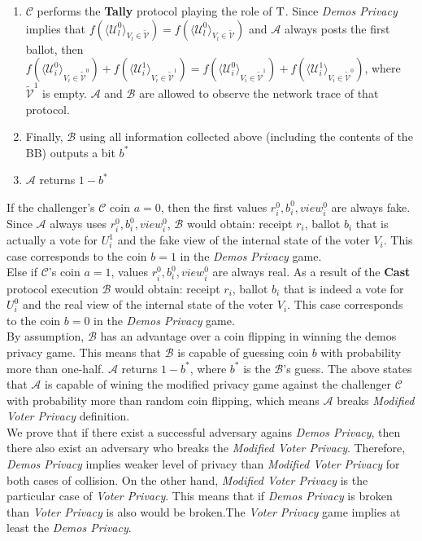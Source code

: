 \begin{enumerate}
\begin{enumerate}
\item $\mathcal{C}$ performs the \textbf{Tally} protocol playing the role of $\operatorname{T}$. Since \textit{Demos Privacy} implies that  $f(\langle \mathcal{U}^0_l \rangle _{V_l \in \tilde{\mathcal{V}}} ) = f(\langle \mathcal{U}^0_l \rangle _{V_l \in \tilde{\mathcal{V}}})$ and  $\mathcal{A}$ always posts the first ballot, then  $f(\langle \mathcal{U}^0_i \rangle _{V_i \in \tilde{\mathcal{V}}^0} ) + f(\langle \mathcal{U}^1_i \rangle _{V_i \in \tilde{\mathcal{V}}^1} ) =  f(\langle \mathcal{U}^0_i \rangle _{V_i \in \tilde{\mathcal{V}}^1} ) +  f(\langle \mathcal{U}^1_i \rangle _{V_i \in \tilde{\mathcal{V}}^0} )$, where $\tilde{\mathcal{V}}^1$ is empty.  $\mathcal{A}$ and  $\mathcal{B}$ are allowed to observe the network trace of that protocol. 
\item Finally, $\mathcal{B}$ using all information collected above (including the contents of the BB) outputs a bit $b^*$
\item $\mathcal{A}$ returns $1 - b^*$
 \end{enumerate} 
  \end{enumerate} 
 
If the challenger's  $\mathcal{C}$ coin $a=0$, then the first values $r^0_i,b_i^0,view_i^0$ are always fake. Since $\mathcal{A}$ always uses $r^0_i,b_i^0,view_i^0$, $\mathcal{B}$ would obtain: receipt $r_i$, ballot $b_i$ that is actually a vote for $U^1_i$  and the fake view of the internal state of the voter $V_i$. This case corresponds to the coin $b=1$ in the \textit{Demos Privacy} game. \\

Else if $\mathcal{C}$'s coin $a=1$, values $r^0_i,b_i^0,view_i^0$ are always real. As a result of the \textbf{Cast}  protocol execution $\mathcal{B}$ would obtain: receipt $r_i$, ballot $b_i$ that is indeed a vote for $U^0_i$  and the real view of the internal state of the voter $V_i$. This case corresponds to the coin $b=0$ in the \textit{Demos Privacy} game.\\
 
By assumption, $\mathcal{B}$ has an advantage over a coin flipping in winning the demos privacy game. This means that  $\mathcal{B}$ is capable of guessing coin $b$ with probability more than one-half.  $\mathcal{A}$ returns $1-b^*$, where $b^*$ is the $\mathcal{B}$'s guess. The above states that $\mathcal{A}$ is capable of wining the modified privacy game against  the challenger $\mathcal{C}$ with probability more than random coin flipping, which means $\mathcal{A}$ breaks \textit{Modified Voter Privacy} definition.\\ 

We prove that if there exist a successful adversary agains \textit{Demos Privacy}, then there also exist an adversary who breaks the \textit{Modified Voter Privacy}. Therefore, \textit{Demos Privacy} implies weaker level of privacy than \textit{Modified Voter Privacy} for both cases of collision. On the other hand, \textit{Modified Voter Privacy} is the particular case of \textit{Voter Privacy}. This means that if \textit{Demos Privacy} is broken than \textit{Voter Privacy} is also would be broken.The \textit{Voter Privacy} game implies at least the \textit{Demos Privacy}.  